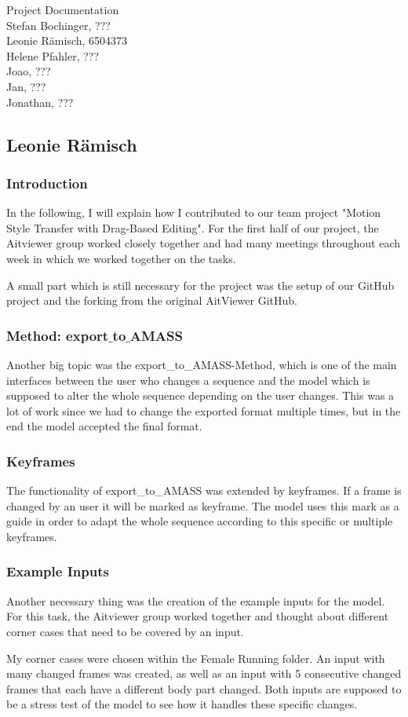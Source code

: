 \documentclass[a4paper]{scrartcl}
\def\header#1#2{
  \begin{center}
    {\Large Project Documentation}\\
    {Stefan Bochinger, ???}\\
    {Leonie Rämisch, 6504373}\\
    {Helene Pfahler, ???}\\
    {Joao, ???}\\
    {Jan, ???}\\
    {Jonathan, ???}
  \end{center}
}
\begin{document}
\header{Nr. \NUMBER}{\DEADLINE}


\subsection*{Leonie Rämisch}
\subsubsection*{Introduction}
In the following, I will explain how I contributed to our team project "Motion Style Transfer with Drag-Based Editing". For the first half of our project, the Aitviewer group worked closely together and had many meetings throughout each week in which we worked together on the tasks. 


A small part which is still necessary for the project was the setup of our GitHub project and the forking from the original AitViewer GitHub.
\subsubsection*{Method: export$\_$to$\_$AMASS}
Another big topic was the export\_to\_AMASS-Method, which is one of the main interfaces between the user who changes a sequence and the model which is supposed to alter the whole sequence depending on the user changes. This was a lot of work since we had to change the exported format multiple times, but in the end the model accepted the final format.

\subsubsection*{Keyframes}
The functionality of export\_to\_AMASS was extended by keyframes. If a frame is changed by an user it will be marked as keyframe. The model uses this mark as a guide in order to adapt the whole sequence according to this specific or multiple keyframes.

\subsubsection*{Example Inputs}
Another necessary thing was the creation of the example inputs for the model. For this task, the Aitviewer group worked together and thought about different corner cases that need to be covered by an input. 

My corner cases were chosen within the Female Running folder. An input with many changed frames was created, as well as an input with 5 consecutive changed frames that each have a different body part changed. Both inputs are supposed to be a stress test of the model to see how it handles these specific changes.\\
\end{document}
